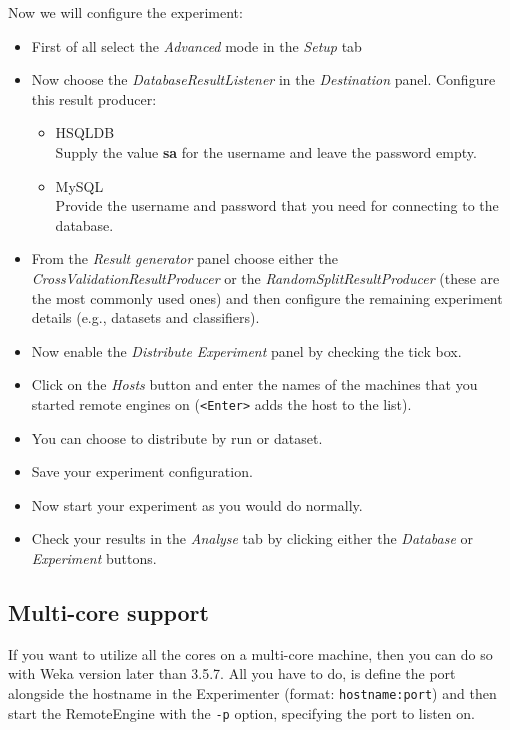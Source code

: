 Now we will configure the experiment:

\begin{itemize}
   \item First of all select the \textit{Advanced} mode in the \textit{Setup} tab
   \item Now choose the \textit{DatabaseResultListener} in the \textit{Destination} panel. Configure this result producer:
   	\begin{itemize}
    		\item HSQLDB \\ Supply the value \textbf{sa} for the username and leave the password empty.
    		\item MySQL \\ Provide the username and password that you need for connecting to the database.
    	\end{itemize}
   \item From the \textit{Result generator} panel choose either the \textit{CrossValidationResultProducer} or the \textit{RandomSplitResultProducer} (these are the most commonly used ones) and then configure the remaining experiment details (e.g., datasets and classifiers).
   \item Now enable the \textit{Distribute Experiment} panel by checking the tick box.
   \item Click on the \textit{Hosts} button and enter the names of the machines that you started remote engines on (\texttt{<Enter>} adds the host to the list).
   \item You can choose to distribute by run or dataset.
   \item Save your experiment configuration.
   \item Now start your experiment as you would do normally.
   \item Check your results in the \textit{Analyse} tab by clicking either the \textit{Database} or \textit{Experiment} buttons.
\end{itemize}


\subsection{Multi-core support}
If you want to utilize all the cores on a multi-core machine, then you can do so with Weka version later than 3.5.7. All you have to do, is define the port alongside the hostname in the Experimenter (format: \texttt{hostname:port}) and then start the RemoteEngine with the \texttt{-p} option, specifying the port to listen on.



